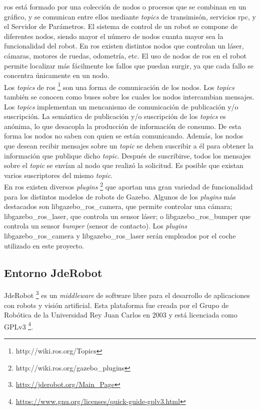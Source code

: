 \acrshort{ros} está formado por una colección de nodos o procesos que se combinan en un gráfico, y se comunican entre ellos mediante \textit{topics} de transimisón, servicios \acrshort{rpc}, y el Servidor de Parámetros. El sistema de control de un robot se compone de diferentes nodos, siendo mayor el número de nodos cuanta mayor sea la funcionalidad del robot. En \acrshort{ros} existen distintos nodos que controlan un láser, cámaras, motores de ruedas, odometría, etc. El uso de nodos de \acrshort{ros} en el robot permite localizar más fácilmente los fallos que puedan surgir, ya que cada fallo se concentra únicamente en un nodo.\\

Los \textit{topics} de \acrshort{ros} \footnote{http://wiki.ros.org/Topics} \cite{ros_book} son una forma de comunicación de los nodos. Los \textit{topics} también se conocen como buses sobre los cuales los nodos intercambian mensajes. Los \textit{topics} implementan un mencanismo de comunicación de publicación y/o suscripción. La semántica de publicación y/o suscripción de los \textit{topics} es anónima, lo que desacopla la producción de información de consumo. De esta forma los nodos no saben con quien se están comunicando. Además, los nodos que desean recibir mensajes sobre un \textit{topic} se deben suscribir a él para obtener la información que publique dicho \textit{topic}. Después de suscribirse, todos los mensajes sobre el \textit{topic} se envían al nodo que realizó la solicitud. Es posible que existan varios suscriptores del mismo \textit{topic}.\\

En \acrshort{ros} existen diversos \textit{plugins} \footnote{http://wiki.ros.org/gazebo\_plugins} que aportan una gran variedad de funcionalidad para los distintos modelos de robots de Gazebo. Algunos de los \textit{plugins} más destacados son libgazebo\_ros\_camera, que permite controlar una cámara; libgazebo\_ros\_laser, que controla un sensor láser; o libgazebo\_ros\_bumper que controla un sensor \textit{bumper} (sensor de contacto). Los \textit{plugins} libgazebo\_ros\_camera y  libgazebo\_ros\_laser serán empleados por el coche utilizado en este proyecto.



\subsection{Entorno JdeRobot}

JdeRobot \footnote{\url{http://jderobot.org/Main_Page}} es un \textit{middleware} de software libre para el desarrollo de aplicaciones con robots y visión artificial. Esta plataforma fue creada por el Grupo de Robótica de la Universidad Rey Juan Carlos en 2003 y está licenciada como GPLv3 \footnote{\url{https://www.gnu.org/licenses/quick-guide-gplv3.html}}.\\

